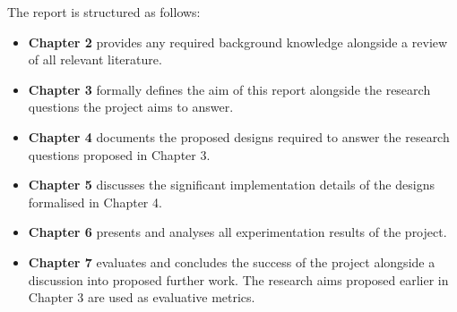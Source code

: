 The report is structured as follows:

\begin{itemize}
    \item \textbf{Chapter 2} provides any required background knowledge alongside a review of all relevant literature.

    \item \textbf{Chapter 3} formally defines the aim of this report alongside the research questions the project aims to answer.

    \item \textbf{Chapter 4} documents the proposed designs required to answer the research questions proposed in Chapter 3.

    \item \textbf{Chapter 5} discusses the significant implementation details of the designs formalised in Chapter 4.

    \item \textbf{Chapter 6} presents and analyses all experimentation results of the project.

    \item \textbf{Chapter 7} evaluates and concludes the success of the project alongside a discussion into proposed further work. The research aims proposed earlier in Chapter 3 are used as evaluative metrics.
\end{itemize}